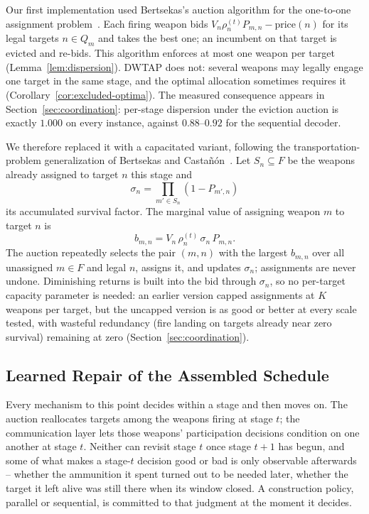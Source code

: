 Our first implementation used Bertsekas's auction algorithm for the one-to-one assignment problem~\cite{bertsekas1988auction}. Each firing weapon bids $V_n\rho_n^{(t)} P_{m,n} - \text{price}(n)$ for its legal targets $n \in Q_m$ and takes the best one; an incumbent on that target is evicted and re-bids. This algorithm enforces at most one weapon per target (Lemma~\ref{lem:dispersion}). DWTAP does not: several weapons may legally engage one target in the same stage, and the optimal allocation sometimes requires it (Corollary~\ref{cor:excluded-optima}). The measured consequence appears in Section~\ref{sec:coordination}: per-stage dispersion under the eviction auction is exactly $1.000$ on every instance, against $0.88$--$0.92$ for the sequential decoder.

We therefore replaced it with a capacitated variant, following the transportation-problem generalization of Bertsekas and Casta\~{n}\'{o}n~\cite{bertsekas1989transportation}. Let $S_n \subseteq F$ be the weapons already assigned to target $n$ this stage and
\begin{equation}
\label{eq:survival-factor}
\sigma_n = \prod_{m' \in S_n} (1 - P_{m',n})
\end{equation}
its accumulated survival factor. The marginal value of assigning weapon $m$ to target $n$ is
\begin{equation}
\label{eq:marginal-bid}
b_{m,n} = V_n\,\rho_n^{(t)}\,\sigma_n\,P_{m,n}.
\end{equation}
The auction repeatedly selects the pair $(m,n)$ with the largest $b_{m,n}$ over all unassigned $m \in F$ and legal $n$, assigns it, and updates $\sigma_n$; assignments are never undone. Diminishing returns is built into the bid through $\sigma_n$, so no per-target capacity parameter is needed: an earlier version capped assignments at $K$ weapons per target, but the uncapped version is as good or better at every scale tested, with wasteful redundancy (fire landing on targets already near zero survival) remaining at zero (Section~\ref{sec:coordination}).

\subsection{Learned Repair of the Assembled Schedule}
\label{sec:repair}

Every mechanism to this point decides within a stage and then moves on. The auction reallocates targets among the weapons firing at stage $t$; the communication layer lets those weapons' participation decisions condition on one another at stage $t$. Neither can revisit stage $t$ once stage $t{+}1$ has begun, and some of what makes a stage-$t$ decision good or bad is only observable afterwards -- whether the ammunition it spent turned out to be needed later, whether the target it left alive was still there when its window closed. A construction policy, parallel or sequential, is committed to that judgment at the moment it decides.

